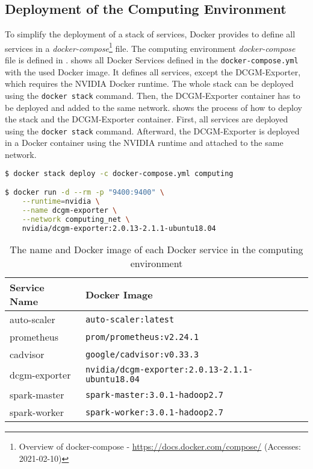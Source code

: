 \subsection{Deployment of the Computing Environment}
\label{subsec:06_env_depl} 
To simplify the deployment of a stack of services, Docker provides to define all services in a \textit{docker-compose}\footnote{Overview of docker-compose - \url{https://docs.docker.com/compose/} (Accesses: 2021-02-10)} file.
The computing environment \textit{docker-compose} file is defined in .
%
 shows all Docker Services defined in the \texttt{docker-compose.yml} with the used Docker image.
%
It defines all services, except the DCGM-Exporter, which requires the NVIDIA Docker runtime.
%
The whole stack can be deployed using the \texttt{docker stack} command. Then, the DCGM-Exporter container has to be deployed and added to the same network.
%
 shows the process of how to deploy the stack and the DCGM-Exporter container. First, all services are deployed using the \texttt{docker stack} command. Afterward, the DCGM-Exporter is deployed in a Docker container using the NVIDIA runtime and attached to the same network.
\begin{lstlisting}[label=lst:06_env_depl_docker-stack, caption=Commands to deploy the computing environment, language=sh, numbers=none]
$ docker stack deploy -c docker-compose.yml computing

$ docker run -d --rm -p "9400:9400" \
    --runtime=nvidia \
    --name dcgm-exporter \
    --network computing_net \
    nvidia/dcgm-exporter:2.0.13-2.1.1-ubuntu18.04
\end{lstlisting}
\begin{table}[]
\centering
\begin{tabular}{@{}ll@{}}
\toprule
Service Name  & Docker Image                                  \\ \midrule
auto-scaler   & \texttt{auto-scaler:latest}                            \\
prometheus    & \texttt{prom/prometheus:v2.24.1}                       \\
cadvisor      & \texttt{google/cadvisor:v0.33.3}                       \\
dcgm-exporter & \texttt{nvidia/dcgm-exporter:2.0.13-2.1.1-ubuntu18.04} \\
spark-master  & \texttt{spark-master:3.0.1-hadoop2.7}                  \\
spark-worker  & \texttt{spark-worker:3.0.1-hadoop2.7}                  \\ \bottomrule
\end{tabular}
\caption{The name and Docker image of each Docker service in the computing environment}
\label{table:06_env_depl_docker-stack}
\end{table}


